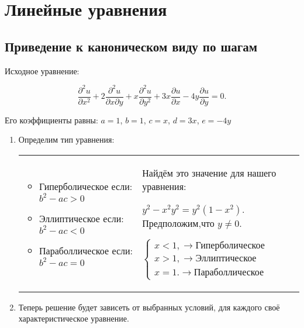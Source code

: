 \documentclass[a4paper, 12pt]{extarticle}
\newcommand{\D}[2]{\frac{\partial #1}{\partial #2}}
\newcommand{\DQ}[2]{\frac{\partial^2 #1}{\partial #2^2}}
\newcommand{\DM}[3]{\frac{\partial^2 #1}{\partial #2 \partial #3}}
\begin{document}
    \section*{Линейные уравнения}
    \subsection*{Приведение к каноническом виду по шагам}
    Исходное уравнение:
    \begin{tcolorbox}[height=1.5cm,valign=center, width=8cm, bottom=0.6cm]
        $$ \DQ{u}{x}+2\DM{u}{x}{y}+x\DQ{u}{y}+3x\D{u}{x}-4y\D{u}{y}=0.$$
    \end{tcolorbox}
    Его коэффициенты равны: $a=1$, $b=1$, $c=x$, $d=3x$, $e=-4y$
    \begin{enumerate}[leftmargin=*]
            
        \item Определим тип уравнения:
        \begin{tcolorbox}
        \begin{tabular}{l  l}
            \begin{minipage}{0.4\textwidth}\begin{itemize}[leftmargin=*]
                \item Гиперболическое если: $b^2-ac>0$
                \item Эллиптическое если: $b^2-ac<0$
                \item Параболлическое если: $b^2-ac=0$
            \end{itemize}\end{minipage} &
            \begin{minipage}{0.5\textwidth}
            Найдём это значение для нашего уравнения:
            
            $y^2-x^2y^2=y^2(1-x^2)$. Предположим,что $y\neq 0$.

            $\begin{cases}
                x<1, \to \text{Гиперболическое}\\ 
                x>1, \to \text{Эллиптическое} \\
                x=1. \to \text{Параболлическое}
            \end{cases}$
            \end{minipage}\\
            \end{tabular}
        \end{tcolorbox}
    

    \item Теперь решение будет зависеть от выбранных условий, для каждого своё 
    характеристическое уравнение.
    

\end{enumerate}
\end{document}
